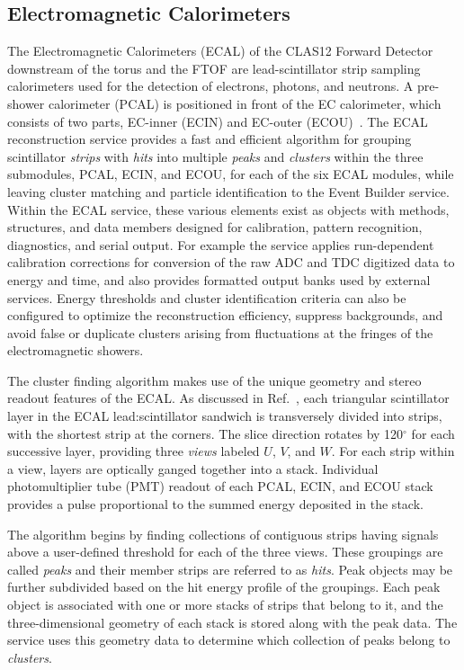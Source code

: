 \subsection{Electromagnetic Calorimeters}

The Electromagnetic Calorimeters (ECAL) of the CLAS12 Forward Detector downstream of the torus and the
FTOF are lead-scintillator strip sampling calorimeters used for the detection of electrons, photons, and
neutrons. A pre-shower calorimeter (PCAL) is positioned in front of the EC calorimeter, which consists of two
parts, EC-inner (ECIN) and EC-outer (ECOU)~\cite{ecal-nim}. The ECAL reconstruction service provides a fast
and efficient algorithm for grouping scintillator {\it strips} with {\it hits} into multiple {\it peaks} and {\it clusters}
within the three submodules, PCAL, ECIN, and ECOU, for each of the six ECAL modules, while leaving cluster
matching and particle identification to the Event Builder service. Within the ECAL service, these various elements
exist as objects with methods, structures, and data members designed for calibration, pattern recognition,
diagnostics, and serial output. For example the service applies run-dependent calibration corrections for conversion
of the raw ADC and TDC digitized data to energy and time, and also provides formatted output banks used by
external services.  Energy thresholds and cluster identification criteria can also be configured to optimize the
reconstruction efficiency, suppress backgrounds, and avoid false or duplicate clusters arising from fluctuations at
the fringes of the electromagnetic showers.

The cluster finding algorithm makes use of the unique geometry and stereo readout features of the ECAL. As
discussed in Ref.~\cite{ecal-nim}, each triangular scintillator layer in the ECAL lead:scintillator sandwich is
transversely divided into strips, with the shortest strip at the corners. The slice direction rotates by 120$^\circ$
for each successive layer, providing three {\it views} labeled $U$, $V$, and $W$.  For each strip within a view,
layers are optically ganged together into a stack.  Individual photomultiplier tube (PMT) readout of each PCAL,
ECIN, and ECOU stack provides a pulse proportional to the summed energy deposited in the stack.

The algorithm begins by finding collections of contiguous strips having signals above a user-defined threshold for
each of the three views. These groupings are called {\it peaks} and their member strips are referred to as
{\it hits}.  Peak objects may be further subdivided based on the hit energy profile of the groupings. Each peak
object is associated with one or more stacks of strips that belong to it, and the three-dimensional geometry of each
stack is stored along with the peak data. The service uses this geometry data to determine which collection of
peaks belong to {\it clusters}.

